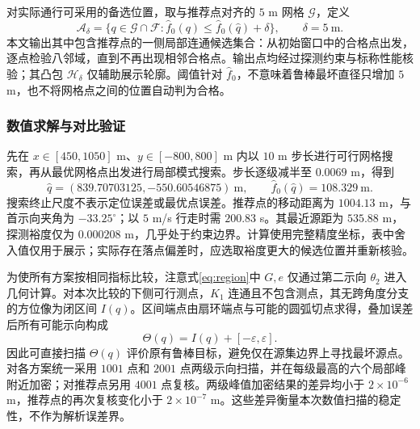 \documentclass[zihao=-4,a4paper,UTF8,fontset=none]{ctexart}
\begin{document}
对实际通行可采用的备选位置，取与推荐点对齐的 $5$ m 网格 $\mathcal G$，定义
\begin{equation}
\mathcal A_\delta=\{q\in\mathcal G\cap\mathcal F:
\widehat f_0(q)\le\widehat f_0(\widehat q)+\delta\},
\qquad \delta=5\ \mathrm m.
\label{eq:candidate}
\end{equation}
本文输出其中包含推荐点的一侧局部连通候选集合：从初始窗口中的合格点出发，逐点检验八邻域，直到不再出现相邻合格点。输出点均经过探测约束与标称性能核验；其凸包 $\mathcal H_\delta$ 仅辅助展示轮廓。阈值针对 $\widehat f_0$，不意味着鲁棒最坏直径只增加 $5$ m，也不将网格点之间的位置自动判为合格。

\subsubsection{数值求解与对比验证}

先在 $x\in[450,1050]$ m、$y\in[-800,800]$ m 内以 $10$ m 步长进行可行网格搜索，再从最优网格点出发进行局部模式搜索。步长逐级减半至 $0.0069$ m，得到
\[
\widehat q=(839.70703125,-550.60546875)\ \mathrm m,
\qquad \widehat f_0(\widehat q)=108.329\ \mathrm m.
\]
搜索终止尺度不表示定位误差或最优点误差。推荐点的移动距离为 $1004.13$ m，与首示向夹角为 $-33.25^\circ$；以 $5$ m/s 行走时需 $200.83$ s。其最近源距为 $535.88$ m，探测裕度仅为 $0.000208$ m，几乎处于约束边界。计算使用完整精度坐标，表中舍入值仅用于展示；实际存在落点偏差时，应选取裕度更大的候选位置并重新核验。

为使所有方案按相同指标比较，注意式\eqref{eq:region}中 $G,e$ 仅通过第二示向 $\theta_2$ 进入几何计算。对本次比较的下侧可行测点，$K_1$ 连通且不包含测点，其无跨角度分支的方位像为闭区间 $I(q)$。区间端点由扇环端点与可能的圆弧切点求得，叠加误差后所有可能示向构成
\[
\Theta(q)=I(q)+[-\varepsilon,\varepsilon].
\]
因此可直接扫描 $\Theta(q)$ 评价原有鲁棒目标，避免仅在源集边界上寻找最坏源点。对各方案统一采用 $1001$ 点和 $2001$ 点两级示向扫描，并在每级最高的六个局部峰附近加密；对推荐点另用 $4001$ 点复核。两级峰值加密结果的差异均小于 $2\times10^{-6}$ m，推荐点的再次复核变化小于 $2\times10^{-7}$ m。这些差异衡量本次数值扫描的稳定性，不作为解析误差界。
\end{document}
